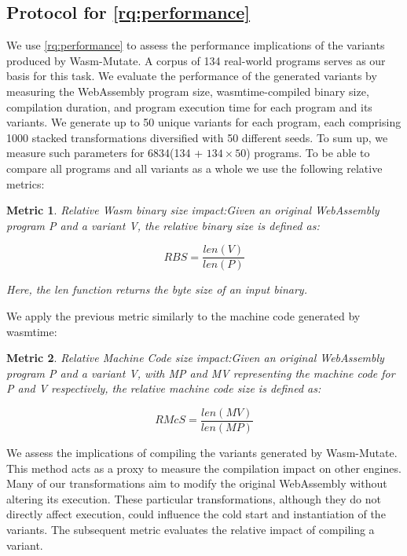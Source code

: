 \documentclass[a4paper,fleqn]{cas-dc}
\newcommand{\tool}{{\sc Wasm-Mutate}\xspace}
\newcommand{\Wasm}{WebAssembly\xspace}
\newtheorem{metric}{Metric}
\newenvironment{revision1}{\color{blue}}{}
\begin{document}
\begin{revision1}

\subsection{Protocol for \ref{rq:performance}}

We use \ref{rq:performance} to assess the performance implications of the variants produced by \tool. 
A corpus of 134 real-world programs serves as our basis for this task. 
We evaluate the performance of the generated variants by measuring the \Wasm program size, wasmtime-compiled binary size, compilation duration, and program execution time for each program and its variants. 
We generate up to 50 unique variants for each program, each comprising 1000 stacked transformations diversified with 50 different seeds.
To sum up, we measure such parameters for 6834(134 + $134\times50$) programs.
To be able to compare all programs and all variants as a whole we use the following relative metrics:

\begin{metric}{Relative Wasm binary size impact:}\label{metric:size} Given an original \Wasm program P and a variant V, the relative binary size is defined as:

$$
    RBS=\frac{len(V)}{len(P)}
$$

Here, the \textit{len} function returns the byte size of an input binary.
\end{metric}

We apply the previous metric similarly to the machine code generated by wasmtime:

\begin{metric}{Relative Machine Code size impact:}\label{metric:mcize} Given an original \Wasm program P and a variant V, with MP and MV representing the machine code for P and V respectively, the relative machine code size is defined as:

$$
    RMcS=\frac{len(MV)}{len(MP)}
$$
     
\end{metric}

We assess the implications of compiling the variants generated by \tool. 
This method acts as a proxy to measure the compilation impact on other engines. 
Many of our transformations aim to modify the original \Wasm without altering its execution. 
These particular transformations, although they do not directly affect execution, could influence the cold start and instantiation of the variants. 
The subsequent metric evaluates the relative impact of compiling a variant.


\end{revision1}
\end{document}

